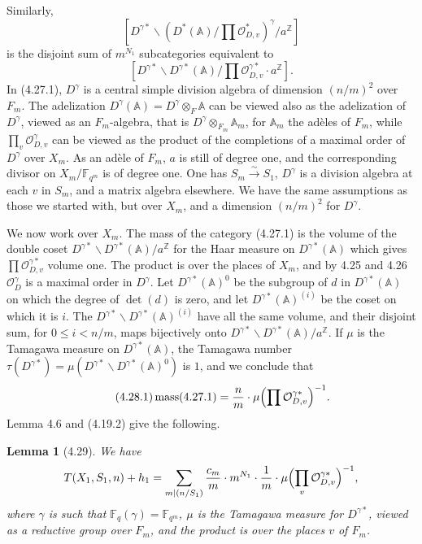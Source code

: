 \documentclass[10pt]{article}
\newcommand{\Fq}{\mathbb F_q}
\newcommand{\Fqm}{\mathbb F_{q^m}}
\newcommand{\Z}{\mathbb Z}
\newcommand{\Adele}{\mathbb A}
\newcommand{\mass}{\operatorname{mass}}
\newcommand{\OD}{\mathcal O_D}
\theoremstyle{deligne}
\newtheorem*{lemma*}{Lemma}
\newcommand{\heading}[1]{\vspace{0.7em}\noindent{\bfseries #1}\quad}
\begin{document}
Similarly,
\[
[D^{\gamma *}\backslash(D^*(\Adele)/\prod\mathcal O_{D,v}^*)^\gamma/a^\Z]
\]
is the disjoint sum of $m^{N_1}$ subcategories equivalent to
\begin{equation}\tag{4.27.1}
[D^{\gamma *}\backslash D^{\gamma *}(\Adele)/\prod\mathcal O_{D,v}^{\gamma *}\cdot a^\Z].
\end{equation}
In (4.27.1), $D^\gamma$ is a central simple division algebra of dimension $(n/m)^2$ over $F_m$. The adelization $D^\gamma(\Adele)=D^\gamma\otimes_F\Adele$ can be viewed also as the adelization of $D^\gamma$, viewed as an $F_m$-algebra, that is $D^\gamma\otimes_{F_m}\Adele_m$, for $\Adele_m$ the ad\`eles of $F_m$, while $\prod_v\mathcal O_{D,v}^\gamma$ can be viewed as the product of the completions of a maximal order of $D^\gamma$ over $X_m$. As an ad\`ele of $F_m$, $a$ is still of degree one, and the corresponding divisor on $X_m/\Fqm$ is of degree one. One has $S_m\xrightarrow{\sim}S_1$, $D^\gamma$ is a division algebra at each $v$ in $S_m$, and a matrix algebra elsewhere. We have the same assumptions as those we started with, but over $X_m$, and a dimension $(n/m)^2$ for $D^\gamma$.

\heading{4.28.} We now work over $X_m$. The mass of the category (4.27.1) is the volume of the double coset $D^{\gamma *}\backslash D^{\gamma *}(\Adele)/a^\Z$ for the Haar measure on $D^{\gamma *}(\Adele)$ which gives $\prod\mathcal O_{D,v}^{\gamma *}$ volume one. The product is over the places of $X_m$, and by 4.25 and 4.26 $\OD^\gamma$ is a maximal order in $D^\gamma$. Let $D^{\gamma *}(\Adele)^0$ be the subgroup of $d$ in $D^{\gamma *}(\Adele)$ on which the degree of $\det(d)$ is zero, and let $D^{\gamma *}(\Adele)^{(i)}$ be the coset on which it is $i$. The $D^{\gamma *}\backslash D^{\gamma *}(\Adele)^{(i)}$ have all the same volume, and their disjoint sum, for $0\le i<n/m$, maps bijectively onto $D^{\gamma *}\backslash D^{\gamma *}(\Adele)/a^\Z$. If $\mu$ is the Tamagawa measure on $D^{\gamma *}(\Adele)$, the Tamagawa number $\tau(D^{\gamma *})=\mu(D^{\gamma *}\backslash D^{\gamma *}(\Adele)^0)$ is $1$, and we conclude that
\begin{equation}\tag{4.28.1}
\mass(4.27.1)=\frac{n}{m}\cdot \mu\Bigl(\prod\mathcal O_{D,v}^{\gamma *}\Bigr)^{-1}.
\end{equation}
Lemma 4.6 and (4.19.2) give the following.

\begin{lemma*}[4.29]
We have
\[
T(X_1,S_1,n)+h_1=\sum_{m\mid(n/S_1)}\frac{c_m}{m}\cdot m^{N_1}\cdot\frac1m\cdot
\mu\Bigl(\prod_v\mathcal O_{D,v}^{\gamma *}\Bigr)^{-1},
\]
where $\gamma$ is such that $\Fq(\gamma)=\Fqm$, $\mu$ is the Tamagawa measure for $D^{\gamma *}$, viewed as a reductive group over $F_m$, and the product is over the places $v$ of $F_m$.
\end{lemma*}
\end{document}
